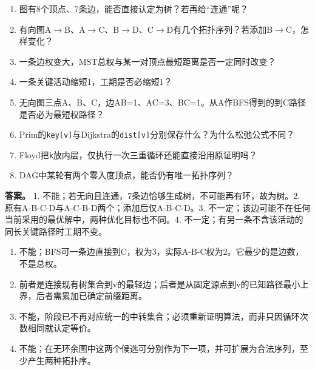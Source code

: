 \begin{enumerate}
\def\labelenumi{\arabic{enumi}.}
\item
  图有8个顶点、7条边，能否直接认定为树？若再给``连通''呢？
\item
  有向图A\ensuremath{\to}B、A\ensuremath{\to}C、B\ensuremath{\to}D、C\ensuremath{\to}D有几个拓扑序列？若添加B\ensuremath{\to}C，怎样变化？
\item
  一条边权变大，MST总权与某一对顶点最短距离是否一定同时改变？
\item
  一条关键活动缩短1，工期是否必缩短1？
\item
  无向图三点A、B、C，边AB=1、AC=3、BC=1。从A作BFS得到的到C路径是否必为最短权路径？
\item
  Prim的\texttt{key[v]}与Dijkstra的\texttt{dist[v]}分别保存什么？为什么松弛公式不同？
\item
  Floyd把\texttt{k}放内层，仅执行一次三重循环还能直接沿用原证明吗？
\item
  DAG中某轮有两个零入度顶点，能否仍有唯一拓扑序列？
\end{enumerate}

\textbf{答案。} 1. 不能；若无向且连通，7条边恰够生成树，不可能再有环，故为树。2. 原有A-B-C-D与A-C-B-D两个；添加后仅A-B-C-D。3. 不一定；该边可能不在任何当前采用的最优解中，两种优化目标也不同。4. 不一定；有另一条不含该活动的同长关键路径时工期不变。

\begin{enumerate}
\def\labelenumi{\arabic{enumi}.}
\setcounter{enumi}{4}
\tightlist
\item
  不能；BFS可一条边直接到C，权为3，实际A-B-C权为2。它最少的是边数，不是总权。
\item
  前者是连接现有树集合到v的最轻边；后者是从固定源点到v的已知路径最小上界，后者需累加已确定前缀距离。
\item
  不能，阶段已不再对应统一的中转集合；必须重新证明算法，而非只因循环次数相同就认定等价。
\item
  不能；在无环余图中这两个候选可分别作为下一项，并可扩展为合法序列，至少产生两种拓扑序。
\end{enumerate}
